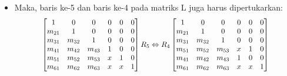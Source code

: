 \documentclass[pdflatex,compress,mathserif]{beamer}
\newcommand*{\Scale}[2][4]{\scalebox{#1}{$#2$}}%
\begin{document}
\begin{frame}
	\begin{itemize}
		\item Maka, baris ke-5 dan baris ke-4 pada matriks L juga harus dipertukarkan:
		\[\Scale[0.9]{
		\begin{bmatrix}
			1 & 0 & 0 & 0 & 0 & 0 \\
			m_{21} & 1 & 0 & 0 & 0 & 0 \\
			m_{31} & m_{32} & 1 & 0 & 0 & 0 \\
			m_{41} & m_{42} & m_{43} & 1 & 0 & 0 \\
			m_{51} & m_{52} & m_{53} & x & 1 & 0 \\
			m_{61} & m_{62} & m_{63} & x & x & 1
		\end{bmatrix}
		R_5 \Leftrightarrow R_4
		\begin{bmatrix}
			1 & 0 & 0 & 0 & 0 & 0 \\
			m_{21} & 1 & 0 & 0 & 0 & 0 \\
			m_{31} & m_{32} & 1 & 0 & 0 & 0 \\
			m_{51} & m_{52} & m_{53} & x & 1 & 0 \\
			m_{41} & m_{42} & m_{43} & 1 & 0 & 0 \\
			m_{61} & m_{62} & m_{63} & x & x & 1
		\end{bmatrix}
		}\]
	\end{itemize}
\end{frame}
\end{document}
